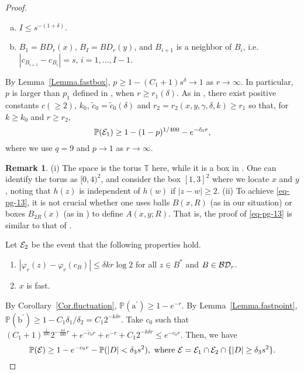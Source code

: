 \documentclass[11pt]{article}
\theoremstyle{definition}
\newtheorem{remark}[theorem]{Remark}
\def \BD {{\cal BD}}
\def \d {\delta}
\def \P {{\mathbb{P}}}
\def \T {{\mathbb{T}}}
\def \ee {{\cal E}}
\begin{document}
\begin{proof}
\begin{enumerate}[(a)]
\item $I \le s^{-(1+\d)}$.
\item $B_1 = BD_r (x)$, $B_I = BD_r (y)$, and
  $B_{i+1}$ is a neighbor of $B_i$,
  i.e. $|c_{B_{i+1}} - c_{B_i}| = s$, $i=1,\ldots,I-1$.
 \end{enumerate}
By Lemma~\ref{Lemma.fastbox}, $p \ge 1 - (C_1 + 1) s^{\d} \to 1$ as $r \to \infty$. In particular, $p$ is larger than $p_1$ defined in \cite[Theorem~1.7]{DZ15}, when $r \ge r_1 (\d )$. As in \cite[Theorem~1.7]{DZ15}, there exist positive constants $c (\geq 2)$, $k_0$, $\tilde c_0 = \tilde c_0 (\d)$ and
$r_2 = r_2 (x, y, \gamma, \d, k) \ge r_1$ so that,  for $k \ge k_0$ and $r \ge r_2$,
 \begin{equation}  \label{eq-pg-13}
  \P(\ee_1)
\ge 1 -  (1-p)^{1/400} - e^{- \tilde c_0 r} ,
 \end{equation}
where we use $q = 9$ and $p \to 1$ as $r \to \infty$.

 \begin{remark}
(i) The space is the torus $\T$ here, while it is a box in \cite{DZ15}. One can identify the torus as $[0,4)^2$, and consider the box $[1,3]^2$ where we locate $x$ and $y$, noting that $h(z)$ is independent of $h(w)$ if $|z-w| \ge 2$. (ii) To achieve \eqref{eq-pg-13}, it is not crucial whether one uses balls $B(x, R)$ (as in our situation) or boxes $B_{2R} (x)$ (as in \cite{DZ15}) to define $A(x,y; R)$. That is, the proof of  \eqref{eq-pg-13} is similar 
to that of \cite[Theorem~1.7]{DZ15}.
 \end{remark}

Let $\ee_2$ be the event that the following properties hold.
 \begin{enumerate}[(a$^\prime$)]
\item  $|\varphi_r (z) - \varphi_r (c_B)| \le \d k r \log 2$ for all $z \in B^*$  and $B \in \BD_r$.

\item $x$ is fast.
 \end{enumerate}
By Corollary~\ref{Cor.fluctuation}, $\P(\mbox{a}^\prime)\geq 1-e^{-r}$. By Lemma~\ref{Lemma.fastpoint},  $\P(\mbox{b}^\prime)\geq 1- C_1 \d_1/ \d_2 = C_1 2^{- k \d r}$. Take $c_0$ such that $(C_1+1)^{\frac 1 {400} }2^{- \frac {k \d} {400} r } +
e^{- \tilde c_0 r} + e^{-r } + C_1 2 ^{- k \d r} \le e^{- c_0 r}$. Then, we have
 $$
\P (\ee) \ge 1 - e^{- c_0 r} - \P ( |D| < \d_3 s^2 ), \ \mbox{where } \ee = \ee_1 \cap \ee_2 \cap  \{ |D| \ge \d_3 s^2 \} .
 $$


\end{proof}
\end{document}
